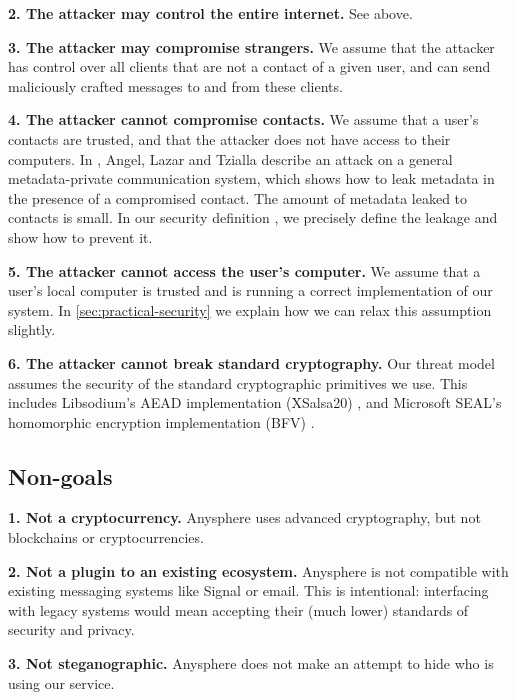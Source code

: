 \textbf{2. The attacker may control the entire internet.} See above.

\textbf{3. The attacker may compromise strangers.} We assume that the attacker has control over all clients that are not a contact of a given user, and can send maliciously crafted messages to and from these clients.

\textbf{4. The attacker cannot compromise contacts.} We assume that a user's contacts are trusted, and that the attacker does not have access to their computers. In \cite{angel2018s}, Angel, Lazar and Tzialla describe an attack on a general metadata-private communication system, which shows how to leak metadata in the presence of a compromised contact. The amount of metadata leaked to contacts is small. In our security definition \cite{LAZ22SecDef}, we precisely define the leakage and show how to prevent it.

\textbf{5. The attacker cannot access the user's computer.} We assume that a user's local computer is trusted and is running a correct implementation of our system. In \cref{sec:practical-security} we explain how we can relax this assumption slightly.

\textbf{6. The attacker cannot break standard cryptography.} Our threat model assumes the security of the standard cryptographic primitives we use. This includes Libsodium's AEAD implementation (XSalsa20) \cite{libsodium}, and Microsoft SEAL's homomorphic encryption implementation (BFV) \cite{sealcrypto}.

\subsection{Non-goals}
\textbf{1. Not a cryptocurrency.} Anysphere uses advanced cryptography, but not blockchains or cryptocurrencies.

\textbf{2. Not a plugin to an existing ecosystem.} Anysphere is not compatible with existing messaging systems like Signal or email. This is intentional: interfacing with legacy systems would mean accepting their (much lower) standards of security and privacy.

\textbf{3. Not steganographic.} Anysphere does not make an attempt to hide who is using our service.

